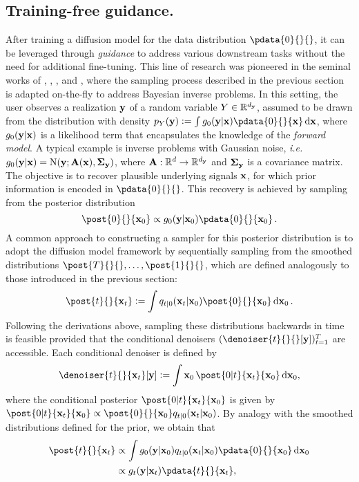 \subsection{Training-free guidance.}
After training a diffusion model for the data distribution $\pdata{0}{}{}$, it can be leveraged through \emph{guidance} to address various downstream tasks without the need for additional fine-tuning. This line of research was pioneered in the seminal works of \citet{song2019generative}, \citet{kadkhodaie2020solving}, \citet{song2021score}, and \citet{kawar2021snips}, where the sampling process described in the previous section is adapted on-the-fly to address Bayesian inverse problems. In this setting, the user observes a realization ${\mathbf{y}}$ of a random variable $Y \in \mathbb{R}^{d_{\mathbf{y}}}$, assumed to be drawn from the distribution with density 
$p_{\bY}(\obs) \eqdef \int \pot{0}{\bx}  \pdata{0}{}{\bx} \, \rmd \bx$, where $\pot{0}{\bx}$ is a likelihood term that encapsulates the knowledge of the \emph{forward model}. A typical example is inverse problems with Gaussian noise, \emph{i.e.} $\pot{0}{\bx} = \normpdf(\obs; \bfA(\bx), \bm\Sigma_\obs)$, where $\mathbf{A} : \mathbb{R}^{d} \to \mathbb{R}^{d_{\mathbf{y}}}$ and $\bm\Sigma_{\mathbf{y}}$ is a covariance matrix. 
The objective is to recover plausible underlying signals $\mathbf{x}$, for which prior information is encoded in $\pdata{0}{}{}$. This recovery is achieved by sampling from the posterior distribution
\[
\post{0}{}{\bx_0} \propto \pot{0}{\bx_0}  \pdata{0}{}{\bx_0}\eqsp.
\]
A common approach to constructing a sampler for this posterior distribution is to adopt the diffusion model framework by sequentially sampling from the smoothed distributions $\post{T}{}{}, \dotsc, \post{1}{}{}$, which are defined analogously to those introduced in the previous section:
\begin{equation}
    \label{eq:smoothed-posterior}
    \post{t}{}{\bx_t} \eqdef \int \fw{t|0}{\bx_0}{\bx_t}  \post{0}{}{\bx_0} \, \rmd \bx_0 \eqsp.
\end{equation}
Following the derivations above, sampling these distributions backwards in time is feasible provided that the conditional denoisers $(\denoiser{t}{}{}[\obs])_{t=1}^T$ are accessible. Each conditional denoiser is  defined by
\[
\denoiser{t}{}{\bx_t}[\obs] \eqdef \int \bx_0 \, \post{0|t}{\bx_t}{\bx_0} \, \rmd \bx_0,
\]
where the conditional posterior $\post{0|t}{\bx_t}{\bx_0}$ is given by
$\post{0|t}{\bx_t}{\bx_0} \propto \post{0}{}{\bx_0} \fw{t|0}{\bx_0}{\bx_t}$.
By analogy with the smoothed distributions defined for the prior, we obtain that
\begin{align}
    \label{eq:posterior-prior}
\post{t}{}{\bx_t} & \propto \int  \pot{0}{\bx_0} \fw{t|0}{\bx_0}{\bx_t} \pdata{0}{}{\bx_0} \, \rmd \bx_0 \nonumber \\
& \propto \pot{t}{\bx_t} \pdata{t}{}{\bx_t}, 
\end{align}
